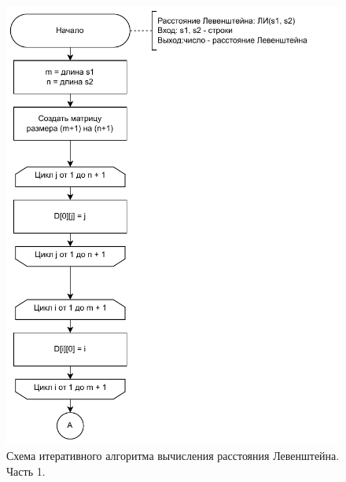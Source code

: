 \begin{figure}[H]
    \centering
    \includegraphics[width=150mm]{images/l_iterative_part1}
    \caption{Схема итеративного алгоритма вычисления расстояния Левенштейна. Часть 1.}
    \label{images:l_iterative_part1}
\end{figure}

